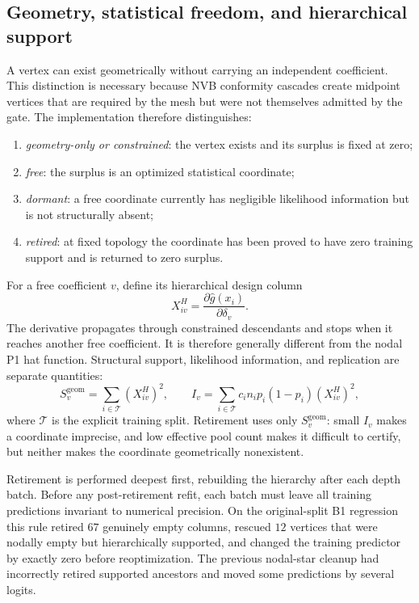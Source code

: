 \documentclass[11pt]{article}
\begin{document}
\subsection{Geometry, statistical freedom, and hierarchical support}\label{sec:lifecycle}
A vertex can exist geometrically without carrying an independent coefficient. This distinction is
necessary because NVB conformity cascades create midpoint vertices that are required by the mesh but
were not themselves admitted by the gate. The implementation therefore distinguishes:
\begin{enumerate}[leftmargin=2em,itemsep=1pt]
\item \emph{geometry-only or constrained}: the vertex exists and its surplus is fixed at zero;
\item \emph{free}: the surplus is an optimized statistical coordinate;
\item \emph{dormant}: a free coordinate currently has negligible likelihood information but is not
structurally absent;
\item \emph{retired}: at fixed topology the coordinate has been proved to have zero training support
and is returned to zero surplus.
\end{enumerate}

For a free coefficient $v$, define its hierarchical design column
\begin{equation}\label{eq:hiercol}
X^H_{iv}=\frac{\partial \hat g(x_i)}{\partial \delta_v}.
\end{equation}
The derivative propagates through constrained descendants and stops when it reaches another free
coefficient. It is therefore generally different from the nodal P1 hat function. Structural support,
likelihood information, and replication are separate quantities:
\begin{equation}\label{eq:support-info}
S_v^{\mathrm{geom}}=\sum_{i\in\mathcal T}(X^H_{iv})^2,
\qquad
I_v=\sum_{i\in\mathcal T} c_i n_i p_i(1-p_i)(X^H_{iv})^2,
\end{equation}
where $\mathcal T$ is the explicit training split. Retirement uses only
$S_v^{\mathrm{geom}}$: small $I_v$ makes a coordinate imprecise, and low effective pool count makes
it difficult to certify, but neither makes the coordinate geometrically nonexistent.

Retirement is performed deepest first, rebuilding the hierarchy after each depth batch. Before any
post-retirement refit, each batch must leave all training predictions invariant to numerical
precision. On the original-split B1 regression this rule retired $67$ genuinely empty columns,
rescued $12$ vertices that were nodally empty but hierarchically supported, and changed the training
predictor by exactly zero before reoptimization. The previous nodal-star cleanup had incorrectly
retired supported ancestors and moved some predictions by several logits.
\end{document}
